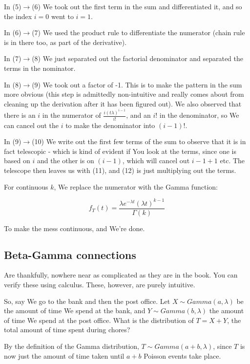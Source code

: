 \documentclass{article}
\begin{document}
		In (5)$\to$(6) We took out the first term in the sum and differentiated it, and so the index $i=0$ went to $i=1$.
		
		In (6)$\to$(7) We used the product rule to differentiate the numerator (chain rule is in there too, as part of the derivative).
		
		In (7)$\to$(8) We just separated out the factorial denominator and separated the terms in the nominator.
		
		In (8)$\to$(9) We took out a factor of -1. This is to make the pattern in the sum more obvious (this step is admittedly non-intuitive and really comes about from cleaning up the derivation after it has been figured out). We also observed that there is an $i$ in the numerator of $\frac{i(t \lambda)^{i-1}}{i!}$, and an $i!$ in the denominator, so We can cancel out the $i$ to make the denominator into $(i-1)!$.
		
		In (9)$\to$(10) We write out the first few terms of the sum to observe that it is in fact telescopic - which is kind of evident if You look at the terms, since one is based on $i$ and the other is on $(i-1)$, which will cancel out $i-1+1$ etc. The telescope then leaves us with (11), and (12) is just multiplying out the terms.
		
		For continuous $k$, We replace the numerator with the Gamma function:
		
		\[ f_T(t)= \frac{\lambda e^{-\lambda t}(\lambda t)^{k-1}}{\Gamma(k)} \]
		
		To make the mess continuous, and We're done.
		
	\subsection{Beta-Gamma connections}
	
		Are thankfully, nowhere near as complicated as they are in the book. You can verify these using calculus. These, however, are purely intuitive.
		
		So, say We go to the bank and then the post office. Let $X\sim Gamma(a, \lambda)$ be the amount of time We spend at the bank, and $Y\sim Gamma(b, \lambda)$ the amount of time We spend at the post office. What is the distribution of $T=X+Y$, the total amount of time spent during chores?
		
		By the definition of the Gamma distribution, $T\sim Gamma(a+b, \lambda)$, since $T$ is now just the amount of time taken until $a+b$ Poisson events take place. 
		
\end{document}
